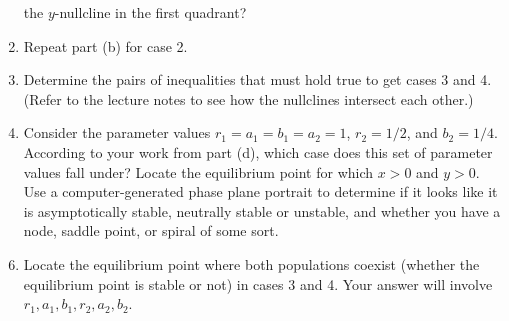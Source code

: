 \documentclass[12pt,letterpaper]{hmcpset}
\begin{document}
\begin{problem}[5]
\begin{enumerate}
            the $y$-nullcline in the first quadrant?
        \item Repeat part (b) for case 2.
        \item Determine the pairs of inequalities that must hold true
            to get cases 3 and 4. (Refer to the lecture notes to see how
            the nullclines intersect each other.)
        \item Consider the parameter values $r_1=a_1=b_1=a_2=1$,
            $r_2=1/2$, and $b_2=1/4$. According to your work from part
            (d), which case does this set of parameter values fall
            under? Locate the equilibrium point for which $x>0$ and
            $y>0$. Use a computer-generated phase plane portrait to
            determine if it looks like it is asymptotically stable,
            neutrally stable or unstable, and whether you have a node,
            saddle point, or spiral of some sort.
    \end{enumerate}
\end{problem}
\begin{problem}[5 cont.]
    \begin{enumerate}
        \setcounter{enumi}{5}
        \item Locate the equilibrium point where both populations
            coexist (whether the equilibrium point is stable or not) in
            cases 3 and 4. Your answer will involve $r_1, a_1, b_1, r_2,
            a_2, b_2$.
    \end{enumerate}
\end{problem}
\begin{solution}
    \null\vfill
\end{solution}
\end{document}
